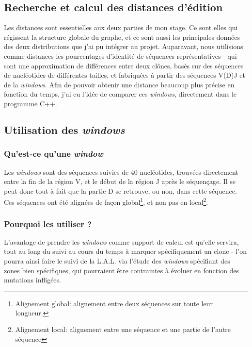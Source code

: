 \documentclass[pdftex,12pt,a4paper]{report}
\begin{document}
\begin{spacing}{1.2}
\chapter{Recherche et calcul des distances d'édition}

Les distances sont essentielles aux deux parties de mon stage. Ce sont elles qui régissent la structure globale du graphe, et ce sont aussi les principales données des deux distributions que j'ai pu intégrer au projet.
\newline
Auparavant, nous utilisions comme distances les pourcentages d'identité de séquences représentatives - qui sont une approximation de différences entre deux clônes, basés sur des séquences de nucléotides de différentes tailles, et fabriquées à partir des séquences V(D)J et de la \textit{windows}.
\newline
Afin de pouvoir obtenir une distance beaucoup plus précise en fonction du temps, j'ai eu l'idée de comparer ces \textit{windows}, directement dans le programme C++.

\section{Utilisation des \textit{windows}}

\subsection{Qu'est-ce qu'une \textit{window}}

Les \textit{windows} sont des séquences suivies de 40 nucléotides, trouvées directement entre la fin de la région V, et le début de la région J après le séquençage. Il se peut donc tout à fait que la partie D se retrouve, ou non, dans cette séquence.
\newline
Ces séquences ont été alignées de façon global\footnote{Alignement global: alignement entre deux séquences sur toute leur longueur.}, et non pas en local\footnote{Alignement local: alignement entre une séquence et une partie de l'autre séquence}.

\subsection{Pourquoi les utiliser ?}

L'avantage de prendre les \textit{windows} comme support de calcul est qu'elle servira, tout au long du suivi au cours du temps à marquer spécifiquement un clone - l'on pourra ainsi faire le suivi de la L.A.L. via l'étude des \textit{windows} spécifiant des zones bien spécifiques, qui pourraient être contraintes à évoluer en fonction des mutations infligées.


\end{spacing}
\end{document}
